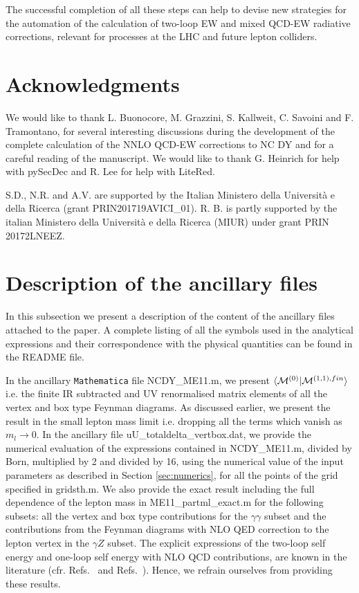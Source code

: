 \documentclass[11pt,a4paper]{article}
\begin{document}
The successful completion of all these steps can help to devise
new strategies for the automation of the calculation of two-loop
EW and mixed QCD-EW radiative corrections,
relevant for processes at the LHC and future lepton colliders.




\section*{Acknowledgments}
We would like to thank L. Buonocore, M. Grazzini, S. Kallweit, C. Savoini and F. Tramontano,
for several interesting discussions during the development of the complete
calculation of the NNLO QCD-EW corrections to NC DY and for a careful reading of the manuscript.
We would like to thank G. Heinrich for help with {\sc pySecDec}
and R. Lee for help with {\sc LiteRed}.

S.D., N.R. and A.V. are supported by the Italian Ministero della Universit\`a e della Ricerca (grant PRIN201719AVICI\_01).
R. B. is partly supported by the italian Ministero della Universit\`a e della Ricerca (MIUR) under grant PRIN 20172LNEEZ.




\appendix
\section{Description of the ancillary files}
\label{app:readme}
In this subsection we present a description of the content of
the ancillary files attached to the paper.
A complete listing of all the symbols used in the analytical expressions
and their correspondence with the physical quantities can be found in the
\textsf{README} file.

In the ancillary {\tt Mathematica} file \textsf{NCDY\_ME11.m},
we present $\langle {\cal M}^{(0)} | {\cal M}^{(1,1),fin} \rangle$ i.e.
the finite IR subtracted and UV renormalised matrix elements of all the vertex
and box type Feynman diagrams.
As discussed earlier, we present the result in the small lepton mass limit
i.e. dropping all the terms which vanish as $m_l \rightarrow 0$.
%
In the ancillary file \textsf{uU\_totaldelta\_vertbox.dat},
we provide the numerical evaluation of
the expressions contained in \textsf{NCDY\_ME11.m},
divided by Born, multiplied by 2 and divided by 16,
using the numerical value of the input parameters as described in Section
\ref{sec:numerics},
for all the points of the grid specified in \textsf{gridsth.m}.
%
We also provide the exact result
including the full dependence of the lepton mass
in \textsf{ME11\_partml\_exact.m}
for the following subsets:
all the vertex and box type contributions for the $\gamma \gamma$ subset
and the contributions from the Feynman diagrams
with NLO QED correction to the lepton vertex in the $\gamma Z$ subset.
%
The explicit expressions
of the two-loop self energy and one-loop self energy with NLO QCD contributions,
are known in the literature (cfr. Refs.~\cite{Dittmaier:2020vra} and Refs.~\cite{Denner:1991kt}).
Hence, we refrain ourselves from providing these results.
\end{document}

